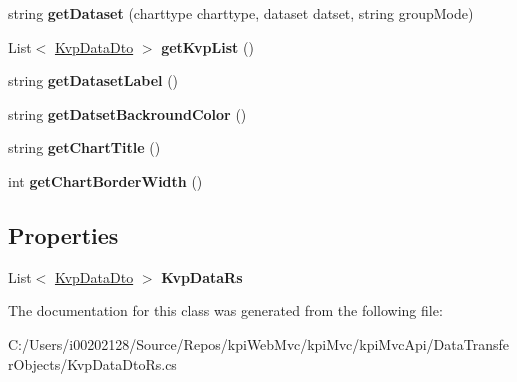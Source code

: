 \begin{DoxyCompactItemize}
string {\bfseries get\+Dataset} (charttype charttype, dataset datset, string group\+Mode)
\item 
\mbox{\label{classkpi_mvc_api_1_1_data_transfer_objects_1_1_kvp_data_dto_rs_ac1bd4b0312a7a0a07b8848d9cdf739da}} 
List$<$ \hyperlink{classkpi_mvc_api_1_1_data_transfer_objects_1_1_kvp_data_dto}{Kvp\+Data\+Dto} $>$ {\bfseries get\+Kvp\+List} ()
\item 
\mbox{\label{classkpi_mvc_api_1_1_data_transfer_objects_1_1_kvp_data_dto_rs_a29e122aca7de38b447056485ad8b4afa}} 
string {\bfseries get\+Dataset\+Label} ()
\item 
\mbox{\label{classkpi_mvc_api_1_1_data_transfer_objects_1_1_kvp_data_dto_rs_ac08415561811e16a01e4fa425709905b}} 
string {\bfseries get\+Datset\+Backround\+Color} ()
\item 
\mbox{\label{classkpi_mvc_api_1_1_data_transfer_objects_1_1_kvp_data_dto_rs_ac1a9b5ca7012ddd12549e157929f23e7}} 
string {\bfseries get\+Chart\+Title} ()
\item 
\mbox{\label{classkpi_mvc_api_1_1_data_transfer_objects_1_1_kvp_data_dto_rs_afcb6b42bf6a7f8271efc95f671bc9e08}} 
int {\bfseries get\+Chart\+Border\+Width} ()
\end{DoxyCompactItemize}
\subsection*{Properties}
\begin{DoxyCompactItemize}
\item 
\mbox{\label{classkpi_mvc_api_1_1_data_transfer_objects_1_1_kvp_data_dto_rs_ae4c7dbba98cf290c43fdbce4172b6ca1}} 
List$<$ \hyperlink{classkpi_mvc_api_1_1_data_transfer_objects_1_1_kvp_data_dto}{Kvp\+Data\+Dto} $>$ {\bfseries Kvp\+Data\+Rs}
\end{DoxyCompactItemize}


The documentation for this class was generated from the following file\+:\begin{DoxyCompactItemize}
\item 
C\+:/\+Users/i00202128/\+Source/\+Repos/kpi\+Web\+Mvc/kpi\+Mvc/kpi\+Mvc\+Api/\+Data\+Transfer\+Objects/Kvp\+Data\+Dto\+Rs.\+cs\end{DoxyCompactItemize}
